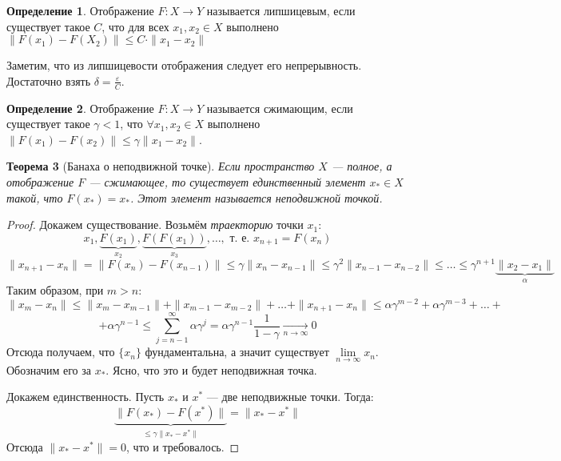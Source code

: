 \documentclass[11pt,openany,a4paper]{scrartcl}
\theoremstyle{plain}
\newtheorem{theorem}{Теорема}[section]
\theoremstyle{definition}
\newtheorem{definition}[theorem]{Определение}
\newcommand{\underto}[1]{\xrightarrow[#1]{}}
\begin{document}
\begin{definition}
    Отображение $F: X \to Y$ называется липшицевым, если существует такое $C$, что
    для всех $x_1, x_2 \in X$ выполнено $\|F(x_1) - F(X_2)\| \leqslant
    C\cdot\|x_1 - x_2\|$
\end{definition}

Заметим, что из липшицевости отображения следует его непрерывность. Достаточно 
взять $\delta = \frac{\varepsilon}{C}$.

\begin{definition}
    Отображение $F: X \to Y$ называется сжимающим, если существует такое
    $\gamma < 1$, что $\forall x_1, x_2 \in X$ выполнено $\|F(x_1) - F(x_2)\|
    \leqslant
    \gamma \|x_1 - x_2\|$.
\end{definition}

\begin{theorem}[Банаха о неподвижной точке]
    Если пространство $X$ — полное, а отображение $F$ — сжимающее, то существует
    единственный элемент $x_\ast \in X$ такой, что $F(x_\ast) = x_\ast$. Этот
    элемент называется неподвижной точкой.
\end{theorem}
\begin{proof}
    Докажем существование. Возьмём \emph{траекторию} точки $x_1$:
    $$
    x_1, \underbrace{F(x_1)}_{x_2}, \underbrace{F(F(x_1))}_{x_3}, \ldots,
    \text{ т. е. } x_{n+1} = F(x_n)
    $$
    $$
    \|x_{n+1} - x_n\| = \|F(x_n) - F(x_{n-1})\| \leqslant \gamma \|x_n - x_{n-1}\|
    \leqslant \gamma^2\|x_{n-1} - x_{n-2}\| \leqslant \ldots \leqslant
    \gamma^{n+1}\underbrace{\|x_2 - x_1\|}_{\alpha}
    $$
    Таким образом, при $m > n$:
    $$
    \|x_m - x_n\| \leqslant \|x_m - x_{m-1}\| + \|x_{m-1} - x_{m-2}\| + \ldots
    + \|x_{n+1} - x_n\| \leqslant \alpha\gamma^{m-2} + \alpha\gamma^{m-3} +\ldots +
    $$
    $$
    + \alpha\gamma^{n-1} \leqslant \sum\limits_{j = n-1}^\infty \alpha\gamma^j =
    \alpha\gamma^{n-1}\frac{1}{1-\gamma} \underto{n \to \infty} 0
    $$
    Отсюда получаем, что $\{x_n\}$ фундаментальна, а значит существует
    $\lim\limits_{n \to \infty} x_n$. Обозначим его за $x_\ast$. Ясно, что это
    и будет неподвижная точка.
    
    Докажем единственность. Пусть $x_\ast$ и $x^\ast$ — две неподвижные точки.
    Тогда:
    $$
    \underbrace{\|F(x_\ast) - F(x^\ast)\|}_{\leqslant \gamma\|x_\ast - x^\ast\|} =
    \|x_\ast - x^\ast\|
    $$
    Отсюда $\|x_\ast - x^\ast\| = 0$, что и требовалось.
\end{proof}
\end{document}
